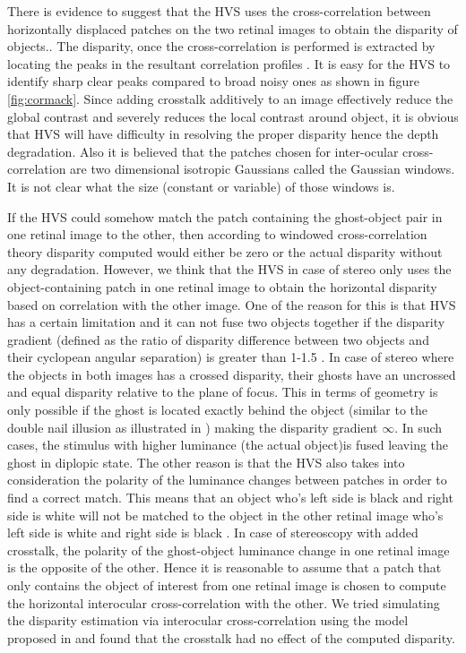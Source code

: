 There is evidence to suggest that the HVS uses the cross-correlation between horizontally displaced patches on the two retinal images to obtain the disparity of objects.\cite{filippini2009limits}\cite{kane2014limits}. The disparity, once the cross-correlation is performed is extracted by locating the peaks in the resultant correlation profiles \cite{cormack1991interocular}. It is easy for the HVS to identify sharp clear peaks compared to broad noisy ones as shown in figure \ref{fig:cormack}. Since adding crosstalk additively to an image effectively reduce the global contrast and severely reduces the local contrast around object, it is obvious that HVS will have difficulty in resolving the proper disparity hence the depth degradation. Also it is believed that the patches chosen for inter-ocular cross-correlation are two dimensional isotropic Gaussians\cite{filippini2009limits} called the Gaussian windows. It is not clear what the size (constant or variable) of those windows is.

If the HVS could somehow match the patch containing the ghost-object pair in one retinal image to the other, then according to windowed cross-correlation theory disparity computed would either be zero or the actual disparity without any degradation. However, we think that the HVS in case of stereo only uses the object-containing patch in one retinal image to obtain the horizontal disparity based on correlation with the other image. One of the reason for this is that HVS has a certain limitation and it can not fuse two objects together if the disparity gradient (defined as the ratio of disparity difference between two objects and their cyclopean angular separation) is greater than 1-1.5 \cite{howard1995binocular} \cite{kane2014limits}. In case of stereo where the objects in both images has a crossed disparity, their ghosts have an uncrossed and equal disparity relative to the plane of focus. This in terms of geometry is only possible if the ghost is located exactly behind the object (similar to the double nail illusion as illustrated in \cite{tsirlin2012effect} \cite{krol1980double}) making the disparity gradient $\infty$. In such cases, the stimulus with higher luminance (the actual object)is fused leaving the ghost in diplopic state. The other reason is that the HVS also takes into consideration the polarity of the luminance changes between patches in order to find a correct match. This means that an object who's left side is black and right side is white will not be matched to the object in the other retinal image who's left side is white and right side is black \cite{howard1995binocular}. In case of stereoscopy with added crosstalk, the polarity of the ghost-object luminance change in one retinal image is the opposite of the other. Hence it is reasonable to assume that a patch that only contains the object of interest from one retinal image is chosen to compute the horizontal interocular cross-correlation with the other. We tried simulating the disparity estimation via interocular cross-correlation using the model proposed in \cite{filippini2009limits} and found that the crosstalk had no effect of the computed disparity.

